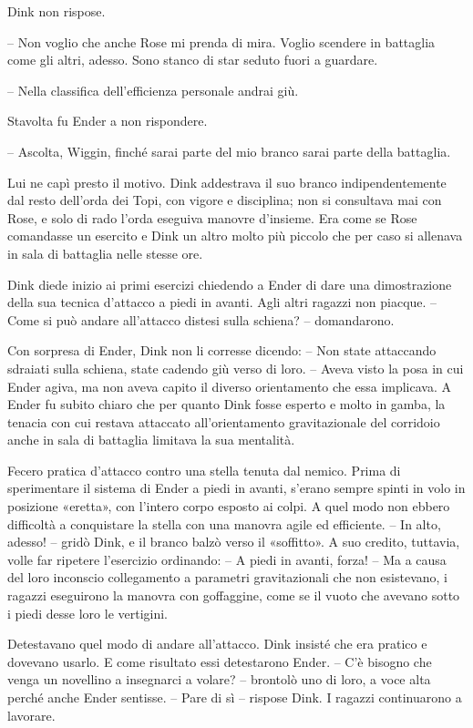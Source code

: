 {Dink non rispose.}

{-- Non voglio che anche Rose mi prenda di mira. Voglio scendere in
	battaglia come gli altri, adesso. Sono stanco di star seduto fuori a
	guardare.}

{-- Nella classifica dell'efficienza personale andrai giù.}

{Stavolta fu Ender a non rispondere.}

{-- Ascolta, Wiggin, finché sarai parte del mio branco sarai parte della
	battaglia.}

{Lui ne capì presto il motivo. Dink addestrava il suo branco
	indipendentemente dal resto dell'orda dei Topi, con vigore e disciplina;
	non si consultava mai con Rose, e solo di rado l'orda eseguiva manovre
	d'insieme. Era come se Rose comandasse un esercito e Dink un altro molto
	più piccolo che per caso si allenava in sala di battaglia nelle stesse
	ore.}

{Dink diede inizio ai primi esercizi chiedendo a Ender di dare una
	dimostrazione della sua tecnica d'attacco a piedi in avanti. Agli altri
	ragazzi non piacque. -- Come si può andare all'attacco distesi sulla
	schiena? -- domandarono.}

{Con sorpresa di Ender, Dink non li corresse dicendo: -- Non state
	attaccando sdraiati sulla schiena, state cadendo giù verso di loro. --
	Aveva visto la posa in cui Ender agiva, ma non aveva capito il diverso
	orientamento che essa implicava. A Ender fu subito chiaro che per quanto
	Dink fosse esperto e molto in gamba, la tenacia con cui restava
	attaccato all'orientamento gravitazionale del corridoio anche in sala di
	battaglia limitava la sua mentalità.}

{Fecero pratica d'attacco contro una stella tenuta dal nemico. Prima di
	sperimentare il sistema di Ender a piedi in avanti, s'erano sempre
	spinti in volo in posizione «eretta», con l'intero corpo esposto ai
	colpi. A quel modo non ebbero difficoltà a conquistare la stella con una
	manovra agile ed efficiente. -- In alto, adesso! -- gridò Dink, e il
	branco balzò verso il «soffitto». A suo credito, tuttavia, volle far
	ripetere l'esercizio ordinando: -- A piedi in avanti, forza! -- Ma a
	causa del loro inconscio collegamento a parametri gravitazionali che non
	esistevano, i ragazzi eseguirono la manovra con goffaggine, come se il
	vuoto che avevano sotto i piedi desse loro le vertigini.}

{Detestavano quel modo di andare all'attacco. Dink insisté che era
	pratico e dovevano usarlo. E come risultato essi detestarono Ender. --
	C'è bisogno che venga un novellino a insegnarci a volare? -- brontolò
	uno di loro, a voce alta perché anche Ender sentisse. -- Pare di sì --
	rispose Dink. I ragazzi continuarono a lavorare.}

